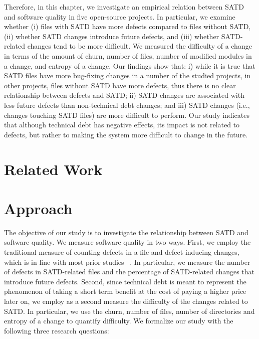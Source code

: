 Therefore, in this chapter, we investigate an empirical relation between SATD and software quality in five open-source projects. In particular, we examine whether (i) files with SATD have more defects compared to files without SATD, (ii) whether SATD changes introduce future defects, and (iii) whether SATD-related changes tend to be more difficult. We measured the difficulty of a change in terms of the amount of churn, number of files, number of modified modules in a change, and entropy of a change. Our findings show that: i) while it is true that SATD files have more bug-fixing changes in a number of the studied projects, in other projects, files without SATD have more defects, thus there is no clear relationship between defects and SATD; ii) SATD changes are associated with less future defects than non-technical debt changes; and iii) SATD changes (i.e., changes touching SATD files) are more difficult to perform. Our study indicates that although technical debt has negative effects, its impact is not related to defects, but rather to making the system more difficult to change in the future.


\section{Related Work}
\label{chap3:sec:related_work}

\section{Approach}
\label{chap3:sec:approach}

The objective of our study is to investigate the relationship between SATD and software quality. We measure software quality in two ways. First, we employ the traditional measure of counting defects in a file and defect-inducing changes, which is in line with most prior studies ~\cite{Kamei-tse-2013,Kim-tse-2008,sliwerski-msr-2005}. In particular, we measure the number of defects in SATD-related files and the percentage of SATD-related changes that introduce future defects. Second, since technical debt is meant to represent the phenomenon of taking a short term benefit at the cost of paying a higher price later on, we employ as a second measure the difficulty of the changes related to SATD. In particular, we use the churn, number of files, number of directories and entropy of a change to quantify difficulty. We formalize our study with the following three research questions:


